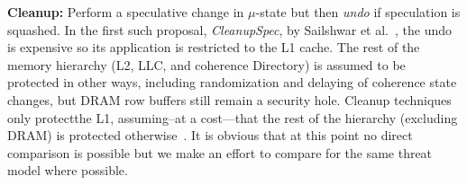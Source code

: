 \item{\textbf{Cleanup:}} Perform a speculative change in $\mu$-state but then \emph{undo} if speculation is squashed. In the first such proposal, \emph{CleanupSpec}, by Sailshwar et al.~\cite{saileshwar2019cleanupspec}, the undo is expensive so its application is restricted to the L1 cache. The rest of the memory hierarchy (L2, LLC, and coherence Directory) is assumed to be protected in other ways, including randomization and delaying of coherence state changes, but DRAM row buffers still remain a security hole.
Cleanup techniques only protectthe L1, assuming--at a cost---that the rest of the hierarchy (excluding DRAM) is protected otherwise~\cite{saileshwar2019cleanupspec}. 
\squishend
{\color{red} It is obvious that at this point no direct comparison is possible but we make an effort to compare for the same threat model where possible.}
